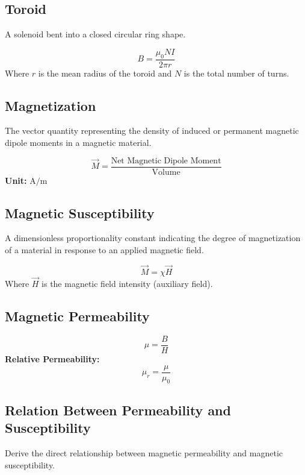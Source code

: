 \documentclass[11pt,a4paper]{article}
\begin{document}
\subsection{Toroid}
\begin{pyqbox}
    A solenoid bent into a closed circular ring shape.
\end{pyqbox}

\begin{formulabox}
    \[ B = \frac{\mu_0 N I}{2\pi r} \]
    Where $r$ is the mean radius of the toroid and $N$ is the total number of turns.
\end{formulabox}

\subsection{Magnetization}
The vector quantity representing the density of induced or permanent magnetic dipole moments in a magnetic material.
\begin{formulabox}
    \[ \vec{M} = \frac{\text{Net Magnetic Dipole Moment}}{\text{Volume}} \]
    \textbf{Unit:} $\text{A/m}$
\end{formulabox}

\subsection{Magnetic Susceptibility}
A dimensionless proportionality constant indicating the degree of magnetization of a material in response to an applied magnetic field.
\begin{formulabox}
    \[ \vec{M} = \chi \vec{H} \]
    Where $\vec{H}$ is the magnetic field intensity (auxiliary field).
\end{formulabox}

\subsection{Magnetic Permeability}
\begin{formulabox}
    \[ \mu = \frac{B}{H} \]
    \textbf{Relative Permeability:}
    \[ \mu_r = \frac{\mu}{\mu_0} \]
\end{formulabox}

\subsection{Relation Between Permeability and Susceptibility}
\begin{pyqbox}
    Derive the direct relationship between magnetic permeability and magnetic susceptibility.
\end{pyqbox}
\end{document}
